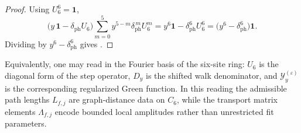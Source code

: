\begin{proof}
Using $U_6^6=\mathbf 1$,
\[
\bigl(y\,\mathbf 1-\delta_{\mathrm{ph}}U_6\bigr)
\sum_{m=0}^{5}y^{5-m}\delta_{\mathrm{ph}}^{\,m}U_6^m
=
y^6\mathbf 1-\delta_{\mathrm{ph}}^6U_6^6
=
\bigl(y^6-\delta_{\mathrm{ph}}^6\bigr)\mathbf 1.
\]
Dividing by $y^6-\delta_{\mathrm{ph}}^6$ gives .
\end{proof}

Equivalently, one may read  in the Fourier basis of the six-site ring: $U_6$ is the diagonal form of the step operator, $D_y$ is the shifted walk denominator, and $\mathcal Y_y^{(\varepsilon)}$ is the corresponding regularized Green function. In this reading the admissible path lengths $L_{f,j}$ are graph-distance data on $C_6$, while the transport matrix elements $\Lambda_{f,j}$ encode bounded local amplitudes rather than unrestricted fit parameters.
